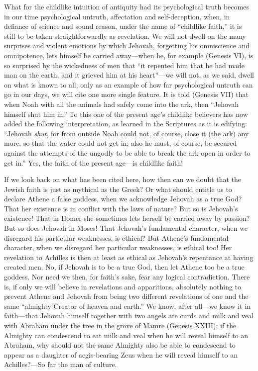 \documentclass[12pt]{book}
\newcommand{\opage}[1]{\marginnote{\footnotesize\textit{[#1]}}}
\begin{document}
What for the childlike intuition of antiquity had its psychological
truth becomes in our time psychological untruth, affectation and
self-deception, when, in defiance of science and sound reason, under the
name of ``childlike faith,'' it is still to be taken straightforwardly
as revelation. We will not dwell on the many surprises and violent
emotions by which Jehovah, forgetting his omniscience and omnipotence,
lets himself be carried away---when
\opage{99}\setcounter{footnote}{0}%
he, for example (Genesis VI), is so surprised by the wickedness of men
that ``it repented him that he had made man on the earth, and it grieved
him at his heart''---we will not, as we said, dwell on what is known to
all; only as an example of how far psychological untruth can go in our
days, we will cite one more single feature. It is told (Genesis VII)
that when Noah with all the animals had safely come into the ark, then
``Jehovah himself shut him in.'' To this one of the present age's
childlike believers has now added the following interpretation, as
learned in the Scriptures as it is edifying: ``Jehovah \emph{shut}, for
from outside Noah could not, of course, close it (the ark) any more, so
that the water could not get in; also he must, of course, be secured
against the attempts of the ungodly to be able to break the ark open in
order to get in.'' Yes, the faith of the present age---is childlike
faith!

If we look back on what has been cited here, how then can we doubt that
the Jewish faith is just as mythical as the Greek? Or what should
entitle us to declare Athene a false goddess, when we acknowledge
Jehovah as a true God? That her existence is in conflict with the laws
of nature? But so is Jehovah's existence! That in Homer she sometimes
lets herself be carried away by passion? But so does Jehovah in Moses!
That Jehovah's fundamental character, when we disregard his particular
weaknesses, is ethical? But Athene's fundamental character, when we
disregard her particular weaknesses, is ethical too! Her revelation to
Achilles is then at least as ethical as Jehovah's repentance at having
created men. No, if Jehovah is to be a true God, then let Athene too be
a true goddess. Nor need we then, for faith's sake, fear any logical
contradiction. There is, if only we will believe in
\opage{100}\setcounter{footnote}{0}%
revelations and apparitions, absolutely nothing to prevent Athene and
Jehovah from being two different revelations of one and the same
``almighty Creator of heaven and earth.'' We know, after all---we know
it in faith---that Jehovah himself together with two angels ate curds
and milk and veal with Abraham under the tree in the grove of Mamre
(Genesis XXIII); %
if the Almighty can condescend to eat milk and veal when he will reveal
himself to an Abraham, why should not the same Almighty also be able to
condescend to appear as a daughter of aegis-bearing Zeus when he will
reveal himself to an Achilles?---So far the man of culture.
\end{document}
